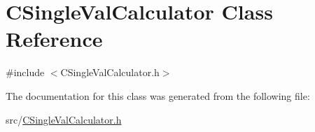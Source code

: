 \hypertarget{classCSingleValCalculator}{}\section{C\+Single\+Val\+Calculator Class Reference}
\label{classCSingleValCalculator}


{\ttfamily \#include $<$C\+Single\+Val\+Calculator.\+h$>$}



The documentation for this class was generated from the following file\+:\begin{DoxyCompactItemize}
\item 
src/\hyperlink{CSingleValCalculator_8h}{C\+Single\+Val\+Calculator.\+h}\end{DoxyCompactItemize}
